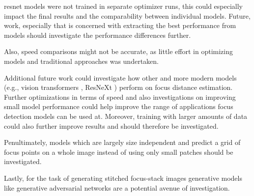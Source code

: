 \Ac{resnet} models were not trained in separate optimizer runs, this could especially impact the final results and the comparability between individual models. Future, work, especially that is concerned with extracting the best performance from models should investigate the performance differences further.

Also, speed comparisons might not be accurate, as little effort in optimizing models and traditional approaches was undertaken.

Additional future work could investigate how other and more modern models (e.g., vision transformers \cite{dosovitskiy2021image}, ResNeXt \cite{xie2017aggregated}) perform on focus distance estimation. Further optimizations in terms of speed and also investigations on improving small model performance could help improve the range of applications focus detection models can be used at.
Moreover, training with larger amounts of data could also further improve results and should therefore be investigated.

Penultimately, models which are largely size independent and predict a grid of focus points on a whole image instead of using only small patches should be investigated.

Lastly, for the task of generating stitched focus-stack images generative models like generative adversarial networks \cite{goodfellow2014generative} are a potential avenue of investigation.